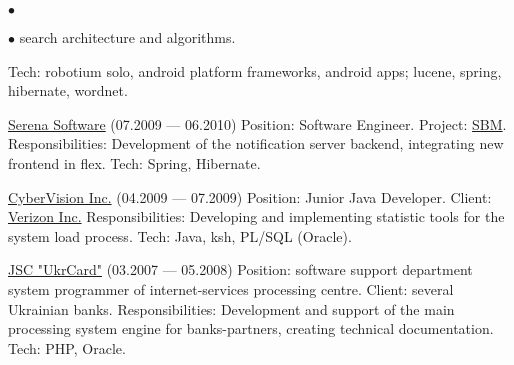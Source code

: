 \documentclass[a4paper,11pt]{article}
\begin{document}
\begin{enumerate}
\begin{list}{$\bullet$}{}
\begin{list}{$\bullet$}{}
              search architecture and algorithms.\newline
          \end{list}
          Tech: robotium solo, android platform frameworks, android apps; lucene, spring, hibernate, wordnet.
        \item \href{http://serena.com/}{Serena Software} (07.2009 — 06.2010)\newline
          Position: Software Engineer.\newline
          Project: \href{http://www.serena.com/products/sbm/}{SBM}.\newline
          Responsibilities: Development of the notification server backend, integrating new frontend in flex.\newline
          Tech: Spring, Hibernate.
        \item \href{http://cybervisiontech.com/}{CyberVision Inc.} (04.2009 — 07.2009)\newline
          Position: Junior Java Developer.\newline
          Client: \href{http://verizon.com/}{Verizon Inc.}\newline
          Responsibilities: Developing and implementing statistic tools for the system load process.\newline
          Tech: Java, ksh, PL/SQL (Oracle).
        \item \href{http://ukrcard.com.ua/}{JSC "UkrCard"} (03.2007 — 05.2008)\newline
          Position: software support department system programmer of internet-services processing centre.\newline
          Client: several Ukrainian banks.\newline
          Responsibilities: Development and support of the main processing system engine for banks-partners, creating technical documentation.\newline
          Tech: PHP, Oracle.
      \end{list}
\end{enumerate}
\end{document}
